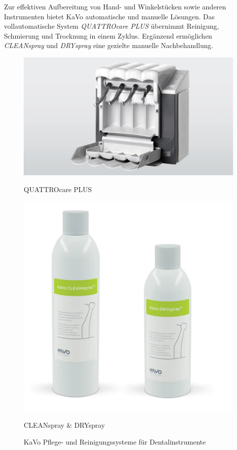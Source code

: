Zur effektiven Aufbereitung von Hand- und Winkelstücken sowie anderen Instrumenten bietet KaVo automatische und manuelle Lösungen. Das vollautomatische System \textit{QUATTROcare PLUS} übernimmt Reinigung, Schmierung und Trocknung in einem Zyklus. Ergänzend ermöglichen \textit{CLEANspray} und \textit{DRYspray} eine gezielte manuelle Nachbehandlung.

\begin{figure}[H]
  \centering
  \begin{minipage}[b]{0.45\textwidth}
    \centering
    \includegraphics[width=\textwidth]{images/QUATTROcare-PLUS_open_16-9-2000px.jpg}
    \caption*{QUATTROcare PLUS}
  \end{minipage}
  \hspace{0.05\textwidth}
  \begin{minipage}[b]{0.45\textwidth}
    \centering
    \includegraphics[width=\textwidth]{images/KaVo-CLEANspray-DRYspray.jpg}
    \caption*{CLEANspray \& DRYspray}
  \end{minipage}
  \caption{KaVo Pflege- und Reinigungssysteme für Dentalinstrumente}
  \label{fig:PflegeReinigung}
\end{figure}
\vspace{1em}




